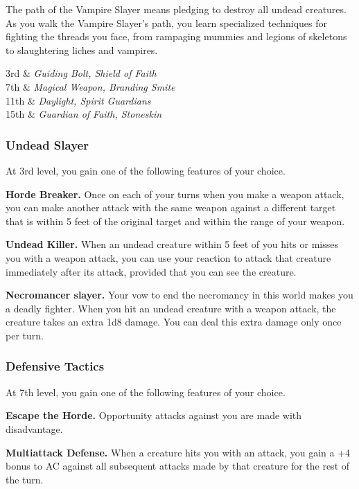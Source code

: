 The path of the Vampire Slayer means pledging to destroy all undead creatures. As you walk the Vampire Slayer's path, you learn specialized techniques for fighting the threads you face, from rampaging mummies and legions of skeletons to slaughtering liches and vampires.

\begin{archetypespells}
	3rd & \textit{Guiding Bolt, Shield of Faith} \\
	7th & \textit{Magical Weapon, Branding Smite} \\
	11th & \textit{Daylight, Spirit Guardians} \\
	15th & \textit{Guardian of Faith, Stoneskin} \\
\end{archetypespells}

\subsubsection*{Undead Slayer}
At 3rd level, you gain one of the following features of your choice.

\textbf{Horde Breaker.} Once on each of your turns when you make a weapon attack, you can make another attack with the same weapon against a different target that is within 5 feet of the original target and within the range of your weapon.

\textbf{Undead Killer.} When an undead creature within 5 feet of you hits or misses you with a weapon attack, you can use your reaction to attack that creature immediately after its attack, provided that you can see the creature.

\textbf{Necromancer slayer.} Your vow to end the necromancy in this world makes you a deadly fighter. When you hit an undead creature with a weapon attack, the creature takes an extra 1d8 damage. You can deal this extra damage only once per turn.

\subsubsection*{Defensive Tactics}
At 7th level, you gain one of the following features of your choice.

\textbf{Escape the Horde.} Opportunity attacks against you are made with disadvantage.

\textbf{Multiattack Defense.} When a creature hits you with an attack, you gain a +4 bonus to AC against all subsequent attacks made by that creature for the rest of the turn.

